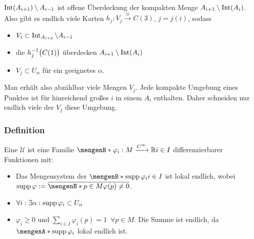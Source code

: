 $\Int(A_{i+1}) \setminus A_{i-1}$ ist offene Überdeckung der kompakten Menge $A_{i+1} \setminus \Int(A_{i})$. Also gibt es endlich viele Karten $h_j : V_j \xrightarrow{\cong} C(3) $, $j= j(i)$, sodass 
\begin{itemize}
	\item $V_i \subset \Int_{A_{i+2}} \setminus A_{i-1}$
	\item die $h_j ^{-1}\enbrace[\big]{C(1)}$ überdecken $A_{i+1} \setminus \Int(A_i)$
	\item $V_j \subset U_\alpha$ für ein geeignetes $\alpha$.
\end{itemize}
Man erhält also abzählbar viele Mengen $V_j$. Jede kompakte Umgebung eines Punktes ist für hinreichend großes $i$ in einem $A_i$ enthalten. Daher schneiden nur endlich 
viele der $V_j$ diese Umgebung. \bewende

\subsubsection[Definition: Untergeordnete Teilung der Eins]{Definition} %
\label{ssub:312}
Eine $\mathcal{U}$  ist eine Familie $\set[\varphi_i : M \xrightarrow{C^\infty} \mathds{R}]{i \in I} $ differenzierbarer Funktionen
mit:
\begin{itemize}
	\item Das Mengensystem der  $\set[\supp \varphi_i]{i \in I} $ ist lokal endlich, wobei $\supp \varphi := \overline{\set[p \in M]{\varphi(p) \not= 0}}$.
	\item $\forall i : \exists \alpha : \supp \varphi_i \subset U_\alpha$
	\item $\varphi_i \ge 0$ und $\sum_{i \in I} \varphi_i(p) = 1 \enspace \forall p \in M$. Die Summe ist endlich, da $\set{\supp \varphi_i}$ lokal endlich ist.
\end{itemize}

